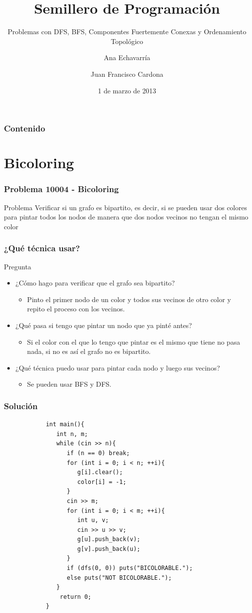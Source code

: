 \documentclass{beamer}
\title{Semillero de Programación}
\subtitle{Problemas con DFS, BFS, Componentes Fuertemente Conexas y Ordenamiento Topológico}
\author{Ana Echavarría \and Juan Francisco Cardona}
\institute{Universidad EAFIT}
\date{1 de marzo de 2013}
\begin{document}
\begin{frame}
	\titlepage
\end{frame}

\begin{frame}
	\frametitle{Contenido}
	\tableofcontents
\end{frame}

\section{Bicoloring}
	\begin{frame}
		\frametitle{Problema 10004 - Bicoloring}
		\begin{block}{Problema}
			Verificar si un grafo es bipartito, es decir, si se pueden usar dos colores para pintar todos los nodos de manera que dos nodos vecinos no tengan el mismo color
		\end{block}
	\end{frame}
	
	\begin{frame}
		\frametitle{¿Qué técnica usar?}
		\begin{alertblock}{Pregunta}
				\begin{itemize}
					\item ¿Cómo hago para verificar que el grafo sea bipartito? \pause
						\begin{itemize}
							\item Pinto el primer nodo de un color y todos sus vecinos de otro color y repito el proceso con los vecinos. \pause
						\end{itemize}
					\item ¿Qué pasa si tengo que pintar un nodo que ya pinté antes? \pause
						\begin{itemize}
							\item Si el color con el que lo tengo que pintar es el mismo que tiene no pasa nada, si no es así el grafo no es bipartito.
						\end{itemize}
					\item ¿Qué técnica puedo usar para pintar cada nodo y luego sus vecinos? \pause
						\begin{itemize}
							\item Se pueden usar BFS y DFS.
						\end{itemize}
				\end{itemize}
		\end{alertblock}
	\end{frame}
	
	\begin{frame}[fragile]
		\frametitle{Solución}
		\begin{lstlisting}
			int main(){
			   int n, m;
			   while (cin >> n){
			      if (n == 0) break;
			      for (int i = 0; i < n; ++i){
			         g[i].clear();
			         color[i] = -1;
			      }
			      cin >> m;
			      for (int i = 0; i < m; ++i){
			         int u, v;
			         cin >> u >> v;
			         g[u].push_back(v);
			         g[v].push_back(u);
			      }
			      if (dfs(0, 0)) puts("BICOLORABLE.");
			      else puts("NOT BICOLORABLE.");
			   }
			    return 0;
			}
		\end{lstlisting}
	\end{frame}
	
\end{document}
